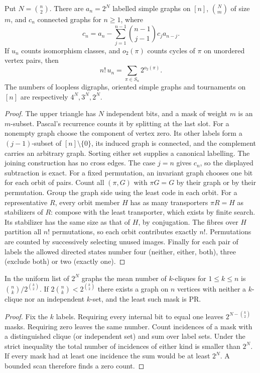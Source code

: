 \begin{proposition}\leavevmode\label{prop:burn}
Put $N=\binom n2$. There are $a_n=2^N$ labelled simple graphs on $[n]$,
$\binom Nm$ of size $m$, and $c_n$ connected graphs for $n\ge1$, where
\[
 c_n=a_n-\sum_{j=1}^{n-1}\binom{n-1}{j-1}c_j a_{n-j}.
\]
If $u_n$ counts isomorphism classes, and $o_2(\pi)$ counts cycles of $\pi$
on unordered vertex pairs, then
\[
 n!\,u_n=\sum_{\pi\in S_n} 2^{o_2(\pi)} .
\]
The numbers of loopless digraphs, oriented simple graphs and tournaments
on $[n]$ are respectively $4^N,3^N,2^N$.
\end{proposition}
\begin{proof}
The upper triangle has $N$ independent bits, and a mask of weight $m$ is
an $m$-subset. Pascal's recurrence counts it by splitting at the last slot.
For a nonempty graph choose the component of vertex zero. Its other labels
form a $(j-1)$-subset of $[n]\setminus\{0\}$, its induced graph is connected,
and the complement carries an arbitrary graph. Sorting either set supplies
a canonical labelling. The joining construction has no cross edges. The case
$j=n$ gives $c_n$, so the displayed subtraction is exact. For a fixed
permutation, an invariant graph chooses one bit for each orbit of pairs.
Count all $(\pi,G)$ with $\pi G=G$ by their graph or by their permutation.
Group the graph side using the least code in each orbit. For a representative
$R$, every orbit member $H$ has as many transporters $\pi R=H$ as stabilizers
of $R$: compose with the least transporter, which exists by finite search.
Its stabilizer has the same size as that of $H$, by conjugation. The fibres
over $H$ partition all $n!$ permutations, so each orbit contributes exactly
$n!$. Permutations are counted by successively selecting unused images.
Finally for each pair of labels the allowed directed states number four
(neither, either, both), three (exclude both) or two (exactly one).
\end{proof}

\begin{corollary}\leavevmode\label{idx:operations-finite-random-graph-counts-and-a-ramsey-lower-certifica}
In the uniform list of $2^N$ graphs the mean number of $k$-cliques for
$1\le k\le n$ is $\binom nk/2^{\binom k2}$. If
$2\binom nk<2^{\binom k2}$ there exists a graph on $n$ vertices with neither
a $k$-clique nor an independent $k$-set, and the least such mask is PR.
\end{corollary}
\begin{proof}
Fix the $k$ labels. Requiring every internal bit to equal one leaves
$2^{N-\binom k2}$ masks. Requiring zero leaves the same number. Count incidences
of a mask with a distinguished clique (or independent set) and sum over label
sets. Under the strict inequality the total number of incidences of either
kind is smaller than $2^N$. If every mask had at least one incidence the
sum would be at least $2^N$. A bounded scan therefore finds a zero count.
\end{proof}

